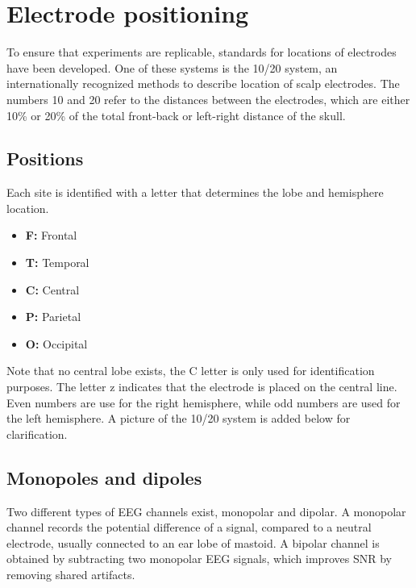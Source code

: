 \section{Electrode positioning}
To ensure that experiments are replicable, standards for locations of electrodes have been developed. One of these systems is the 10/20 system, an internationally recognized methods to describe location of scalp electrodes\cite{TenTwentyManual}. The numbers 10 and 20 refer to the distances between the electrodes, which are either 10\% or 20\% of the total front-back or left-right distance of the skull.

\subsection{Positions}
Each site is identified with a letter that determines the lobe and hemisphere location.
\begin{itemize}
\item \textbf{F:} Frontal
\item \textbf{T:} Temporal
\item \textbf{C:} Central
\item \textbf{P:} Parietal
\item \textbf{O:} Occipital
\end{itemize}
Note that no central lobe exists, the C letter is only used for identification purposes. The letter z indicates that the electrode is placed on the central line. Even numbers are use for the right hemisphere, while odd numbers are used for the left hemisphere. A picture of the 10/20 system is added below for clarification.


\subsection{Monopoles and dipoles}
Two different types of EEG channels exist, monopolar and dipolar. A monopolar channel records the potential difference of a signal, compared to a neutral electrode, usually connected to an ear lobe of mastoid. A bipolar channel is obtained by subtracting two monopolar EEG signals, which improves SNR by removing shared artifacts\cite{MonoBiPolar}. 





 